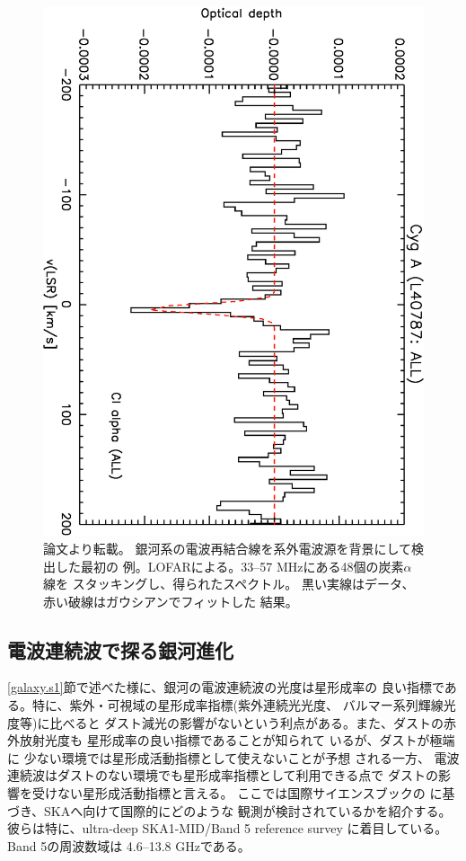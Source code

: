 \begin{figure}[tbp]
\begin{center}
\includegraphics[width=0.6\linewidth,angle=90]{galaxy/oonk_rrl.eps}
\end{center}
\caption{論文\citep{2014MNRAS.437.3506O}より転載。
銀河系の電波再結合線を系外電波源を背景にして検出した最初の
例。LOFARによる。33--57 MHzにある48個の炭素$\alpha$線を
スタッキングし、得られたスペクトル。
黒い実線はデータ、赤い破線はガウシアンでフィットした
結果。}
\label{fig:oonk}
\end{figure}



\subsection{電波連続波で探る銀河進化}
\label{subsec:international_cont}

\ref{galaxy.s1}節で述べた様に、銀河の電波連続波の光度は星形成率の
良い指標である。特に、紫外・可視域の星形成率指標(紫外連続光光度、
バルマー系列輝線光度等)に比べると
ダスト減光の影響がないという利点がある。また、ダストの赤外放射光度も
星形成率の良い指標であることが知られて
いる\citep[例えば][]{1998ARA&A..36..189K,2000PASJ...52..539I}が、ダストが極端に
少ない環境では星形成活動指標として使えないことが予想
される\citep{2001A&A...366...83H}一方、
電波連続波はダストのない環境でも星形成率指標として利用できる点で
ダストの影響を受けない星形成活動指標と言える。
ここでは国際サイエンスブックの
\citet{murphy15}に基づき、SKAへ向けて国際的にどのような
観測が検討されているかを紹介する。彼らは特に、ultra-deep SKA1-MID/Band 5
reference survey \citep{prandoni15}に着目している。Band 5の周波数域は
4.6--13.8 GHzである。

